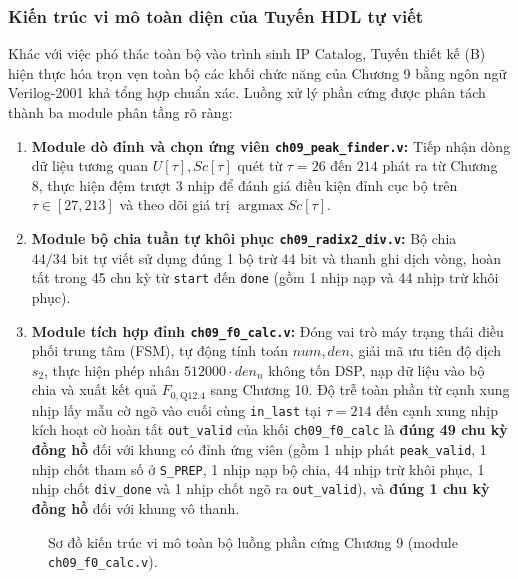 \subsubsection*{Kiến trúc vi mô toàn diện của Tuyến HDL tự viết}
Khác với việc phó thác toàn bộ vào trình sinh IP Catalog, Tuyến thiết kế (B) hiện thực hóa trọn vẹn toàn bộ các khối chức năng của Chương 9 bằng ngôn ngữ Verilog-2001 khả tổng hợp chuẩn xác. Luồng xử lý phần cứng được phân tách thành ba module phân tầng rõ ràng:
\begin{enumerate}[leftmargin=1.5em, itemsep=2pt]
    \item \textbf{Module dò đỉnh và chọn ứng viên \texttt{ch09\_peak\_finder.v}:} Tiếp nhận dòng dữ liệu tương quan $U[\tau], Sc[\tau]$ quét từ $\tau = 26$ đến $214$ phát ra từ Chương 8, thực hiện đệm trượt 3 nhịp để đánh giá điều kiện đỉnh cục bộ trên $\tau \in [27, 213]$ và theo dõi giá trị $\operatorname{argmax} Sc[\tau]$.
    \item \textbf{Module bộ chia tuần tự khôi phục \texttt{ch09\_radix2\_div.v}:} Bộ chia $44/34\text{ bit}$ tự viết sử dụng đúng 1 bộ trừ $44\text{ bit}$ và thanh ghi dịch vòng, hoàn tất trong 45 chu kỳ từ \texttt{start} đến \texttt{done} (gồm 1 nhịp nạp và 44 nhịp trừ khôi phục).
    \item \textbf{Module tích hợp đỉnh \texttt{ch09\_f0\_calc.v}:} Đóng vai trò máy trạng thái điều phối trung tâm (FSM), tự động tính toán $num, den$, giải mã ưu tiên độ dịch $s_2$, thực hiện phép nhân $512000 \cdot den_n$ không tốn DSP, nạp dữ liệu vào bộ chia và xuất kết quả $F_{0, \text{Q12.4}}$ sang Chương 10. Độ trễ toàn phần từ cạnh xung nhịp lấy mẫu cờ ngõ vào cuối cùng \texttt{in\_last} tại $\tau = 214$ đến cạnh xung nhịp kích hoạt cờ hoàn tất \texttt{out\_valid} của khối \texttt{ch09\_f0\_calc} là \textbf{đúng 49 chu kỳ đồng hồ} đối với khung có đỉnh ứng viên (gồm 1 nhịp phát \texttt{peak\_valid}, 1 nhịp chốt tham số ở \texttt{S\_PREP}, 1 nhịp nạp bộ chia, 44 nhịp trừ khôi phục, 1 nhịp chốt \texttt{div\_done} và 1 nhịp chốt ngõ ra \texttt{out\_valid}), và \textbf{đúng 1 chu kỳ đồng hồ} đối với khung vô thanh.
\end{enumerate}

\begin{figure}[H]
\centering

\caption{Sơ đồ kiến trúc vi mô toàn bộ luồng phần cứng Chương 9 (module \texttt{ch09\_f0\_calc.v}).}
\label{fig:ch09_calc_pipeline}
\end{figure}

